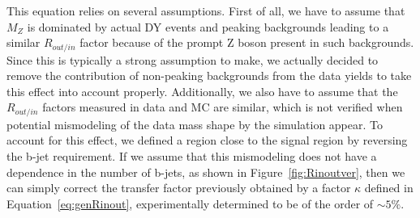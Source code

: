 \documentclass[a4paper, 10pt, openright]{report}
\begin{document}
This equation relies on several assumptions. First of all, we have to assume that $M_Z$ is dominated by actual \ac{DY} events and peaking backgrounds leading to a similar $R_{out/in}$ factor because of the prompt Z boson present in such backgrounds. Since this is typically a strong assumption to make, we actually decided to remove the contribution of non-peaking backgrounds from the data yields to take this effect into account properly. Additionally, we also have to assume that the $R_{out/in}$ factors measured in data and \ac{MC} are similar, which is not verified when potential mismodeling of the data mass shape by the simulation appear. To account for this effect, we defined a region close to the signal region by reversing the b-jet requirement. If we assume that this mismodeling does not have a dependence in the number of b-jets, as shown in Figure~\ref{fig:Rinoutver}, then we can simply correct the transfer factor previously obtained by a factor $\kappa$ defined in Equation~\ref{eq:genRinout}, experimentally determined to be of the order of $\sim 5\%$.%
\end{document}
